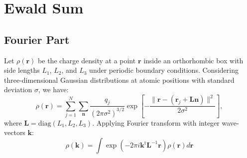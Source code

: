 \documentclass[11pt]{article}
\newcommand{\mt}[1]{\boldsymbol{\mathbf{#1}}}           %
\newcommand{\vt}[1]{\boldsymbol{\mathbf{#1}}}           %
\newcommand{\tr}[1]{#1^\text{t}}                        %
\begin{document}
\section{Ewald Sum}

\subsection{Fourier Part}

Let $\rho(\vt r)$ be the charge density at a point $\vt r$ inside an orthorhombic box with side lengths $L_1$, $L_2$, and $L_3$ under periodic boundary conditions. Considering three-dimensional Gaussian distributions at atomic positions with standard deviation $\sigma$, we have:
\begin{equation*}
\rho(\vt r) = \sum_{j=1}^N \sum_{\vt n} \frac{q_j}{(2\pi\sigma^2)^{3/2}}\exp\left[-\frac{\|\vt r - (\vt r_j + \mt L\vt n)\|^2}{2\sigma^2}\right],
\end{equation*}
where $\mt L = \text{diag}(L_1,L_2,L_3)$. Applying Fourier transform with integer wave-vectors $\vt k$:
\begin{equation*}
\rho(\vt k) = \int \exp\left(-2\pi i \tr{\vt k} {\mt L}^{-1}{\vt r} \right) \rho(\vt r) d\vt r
\end{equation*}
\end{document}
